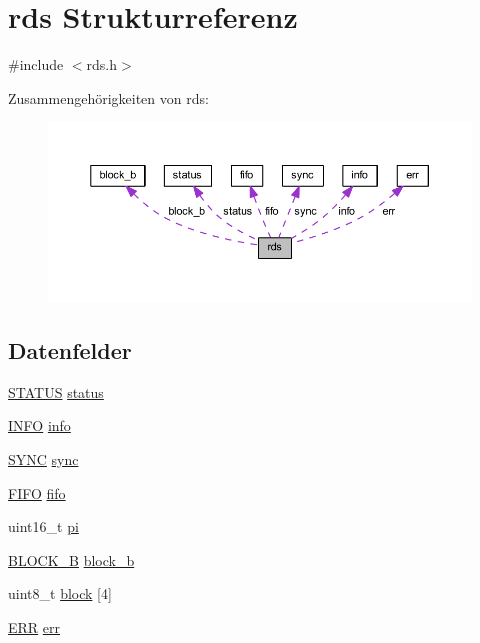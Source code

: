 \hypertarget{structrds}{}\section{rds Strukturreferenz}
\label{structrds}


{\ttfamily \#include $<$rds.\+h$>$}



Zusammengehörigkeiten von rds\+:
\nopagebreak
\begin{figure}[H]
\begin{center}
\leavevmode
\includegraphics[width=350pt]{structrds__coll__graph}
\end{center}
\end{figure}
\subsection*{Datenfelder}
\begin{DoxyCompactItemize}
\item 
\hyperlink{rds_8h_ada2ef00c464f9ae8ec73e127ea6a4520}{S\+T\+A\+T\+U\+S} \hyperlink{structrds_a1025e6cbbd3179d2d91b9b4afb8f8efc}{status}
\item 
\hyperlink{rds_8h_a4d0cac7fd06c1f9b01c6a67516c95cfb}{I\+N\+F\+O} \hyperlink{structrds_a8936b68dc62d34c0bd4298d71e811a89}{info}
\item 
\hyperlink{rds_8h_a09f25e919a775a5955c4fb87155e2762}{S\+Y\+N\+C} \hyperlink{structrds_aa779e41fc5dcd8e1471033612c290b23}{sync}
\item 
\hyperlink{rds_8h_a632395f1ea2941b14cb3baef84705059}{F\+I\+F\+O} \hyperlink{structrds_a7f4b3988a39d63bbb74e44a08285d9ef}{fifo}
\item 
uint16\+\_\+t \hyperlink{structrds_ad1803744db28ac0d226ec8da9134598e}{pi}
\item 
\hyperlink{rds_8h_acde5bba1b29ae92f2d1c088cbc0e40bd}{B\+L\+O\+C\+K\+\_\+\+B} \hyperlink{structrds_ad8c59b1a87492b568b0bf85aef6f5f87}{block\+\_\+b}
\item 
uint8\+\_\+t \hyperlink{structrds_af966591bcdc65611d3f9ec47cd36d52a}{block} \mbox{[}4\mbox{]}
\item 
\hyperlink{rds_8h_aa7225a8602f1106cb23bf648d85efb2c}{E\+R\+R} \hyperlink{structrds_a533130a85d028e42078891666dd6c6fc}{err}
\end{DoxyCompactItemize}


